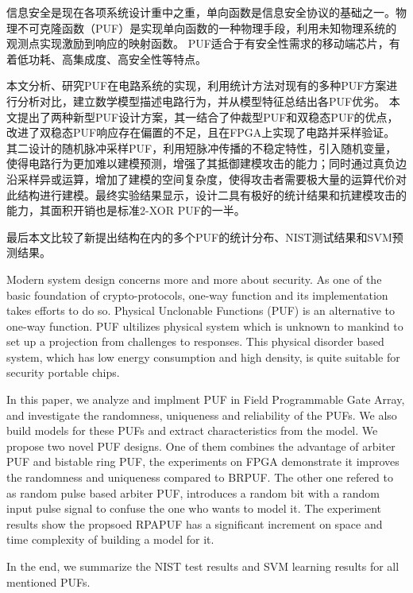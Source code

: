 
\begin{cabstract}
信息安全是现在各项系统设计重中之重，单向函数是信息安全协议的基础之一。物理不可克隆函数（PUF）是实现单向函数的一种物理手段，利用未知物理系统的观测点实现激励到响应的映射函数。
PUF适合于有安全性需求的移动端芯片，有着低功耗、高集成度、高安全性等特点。

本文分析、研究PUF在电路系统的实现，利用统计方法对现有的多种PUF方案进行分析对比，建立数学模型描述电路行为，并从模型特征总结出各PUF优劣。
本文提出了两种新型PUF设计方案，其一结合了仲裁型PUF和双稳态PUF的优点，改进了双稳态PUF响应存在偏置的不足，且在FPGA上实现了电路并采样验证。
其二设计的随机脉冲采样PUF，利用短脉冲传播的不稳定特性，引入随机变量，使得电路行为更加难以建模预测，增强了其抵御建模攻击的能力；同时通过真负边沿采样异或运算，增加了建模的空间复杂度，使得攻击者需要极大量的运算代价对此结构进行建模。最终实验结果显示，设计二具有极好的统计结果和抗建模攻击的能力，其面积开销也是标准2-XOR PUF的一半。

最后本文比较了新提出结构在内的多个PUF的统计分布、NIST测试结果和SVM预测结果。
	
\end{cabstract}

\begin{eabstract}
Modern system design concerns more and more about security. As one of the basic foundation of crypto-protocols, one-way function and its implementation takes efforts to do so. Physical Unclonable Functions (PUF) is an alternative to one-way function. PUF ultilizes physical system which is unknown to mankind to set up a projection from challenges to responses. This physical disorder based system, which has low energy consumption and high density, is quite suitable for security portable chips.

In this paper, we analyze and implment PUF in Field Programmable Gate Array, and investigate the randomness, uniqueness and reliability of the PUFs.
We also build models for these PUFs and extract characteristics from the model.
We propose two novel PUF designs. One of them combines the advantage of arbiter PUF and bistable ring PUF, the experiments on FPGA demonstrate it improves the randomness and uniqueness compared to BRPUF.
The other one refered to as random pulse based arbiter PUF, introduces a random bit with a random input pulse signal to confuse the one who wants to model it. The experiment results show the propsoed RPAPUF has a significant increment on space and time complexity of building a model for it.

In the end, we summarize the NIST test results and SVM learning results for all mentioned PUFs.

\end{eabstract}

